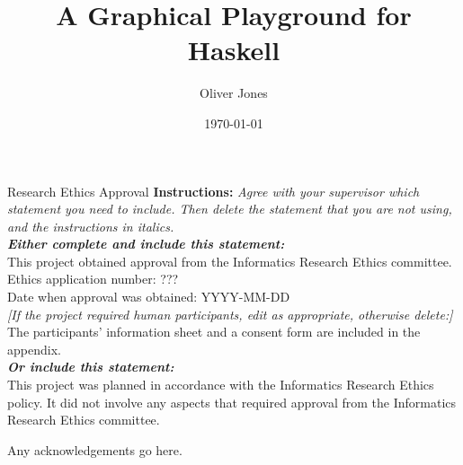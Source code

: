 \documentclass[main.tex]{subfiles}
\begin{document}
\begin{preliminary}

    \title{A Graphical Playground for Haskell}
    \author{Oliver Jones}
    \date{\today}


    \maketitle

    \newenvironment{ethics}{
        \begin{frontenv}{Research Ethics Approval}{\LARGE}} {
        \end{frontenv}
        \newpage}

    \begin{ethics}
        \textbf{Instructions:} \emph{Agree with your supervisor which
            statement you need to include.
            Then delete the statement that you are not using, and the instructions in
                italics.
            \\
            \textbf{Either complete and include this statement:}}\\ %
        This project obtained approval from the Informatics Research Ethics committee.
        \\
        Ethics application number: ???\\
        Date when approval was obtained: YYYY-MM-DD\\
        \emph{[If the project required human participants, edit as appropriate, otherwise delete:]}\\ %
        The participants' information sheet and a consent form are included in the
            appendix.
        \\
        \textbf{\emph{Or include this statement:}}\\ %
        This project was planned in accordance with the Informatics Research Ethics
            policy.
        It did not involve any aspects that required approval from the Informatics
            Research Ethics committee.

        \standarddeclaration
    \end{ethics}

    \begin{acknowledgements}
        Any acknowledgements go here.
    \end{acknowledgements}

    \tableofcontents
\end{preliminary}
\end{document}
